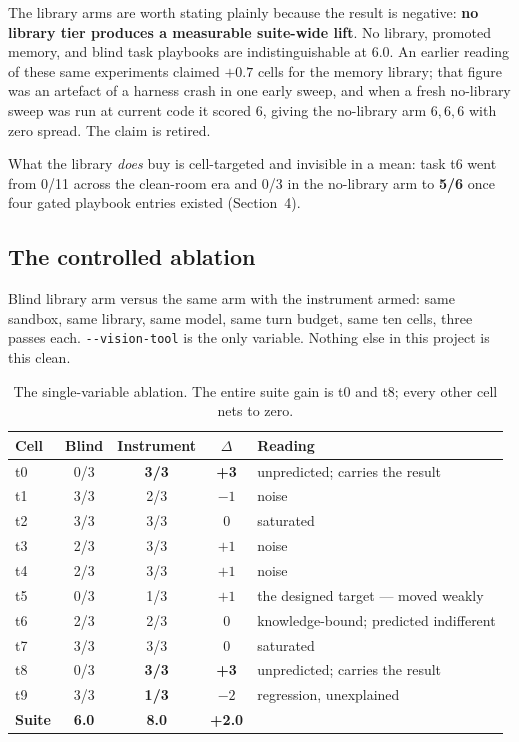 \documentclass[11pt,a4paper]{article}
\newcommand{\vt}{\texttt{-{}-vision-tool}}
\begin{document}
\noindent
The library arms are worth stating plainly because the result is negative:
\textbf{no library tier produces a measurable suite-wide lift}. No library,
promoted memory, and blind task playbooks are indistinguishable at 6.0. An
earlier reading of these same experiments claimed $+0.7$ cells for the memory
library; that figure was an artefact of a harness crash in one early sweep, and
when a fresh no-library sweep was run at current code it scored 6, giving the
no-library arm $6,6,6$ with zero spread. The claim is retired.

What the library \emph{does} buy is cell-targeted and invisible in a mean: task
t6 went from 0/11 across the clean-room era and 0/3 in the no-library arm to
\textbf{5/6} once four gated playbook entries existed (Section~4).

\subsection{The controlled ablation}

Blind library arm versus the same arm with the instrument armed: same sandbox,
same library, same model, same turn budget, same ten cells, three passes each.
\vt{} is the only variable. Nothing else in this project is this clean.

\begin{table}[htbp]
\centering
\small
\begin{tabular}{@{}l c c c l@{}}
\toprule
\textbf{Cell} & \textbf{Blind} & \textbf{Instrument} & \textbf{$\Delta$} & \textbf{Reading} \\
\midrule
t0 & 0/3 & \textbf{3/3} & \textbf{+3} & unpredicted; carries the result \\
t1 & 3/3 & 2/3 & $-1$ & noise \\
t2 & 3/3 & 3/3 & 0 & saturated \\
t3 & 2/3 & 3/3 & $+1$ & noise \\
t4 & 2/3 & 3/3 & $+1$ & noise \\
t5 & 0/3 & 1/3 & $+1$ & the designed target --- moved weakly \\
t6 & 2/3 & 2/3 & 0 & knowledge-bound; predicted indifferent \\
t7 & 3/3 & 3/3 & 0 & saturated \\
t8 & 0/3 & \textbf{3/3} & \textbf{+3} & unpredicted; carries the result \\
t9 & 3/3 & \textbf{1/3} & \textbf{$-2$} & regression, unexplained \\
\midrule
\textbf{Suite} & \textbf{6.0} & \textbf{8.0} & \textbf{+2.0} & \\
\bottomrule
\end{tabular}
\caption{The single-variable ablation. The entire suite gain is t0 and t8; every
other cell nets to zero.}
\end{table}
\end{document}
